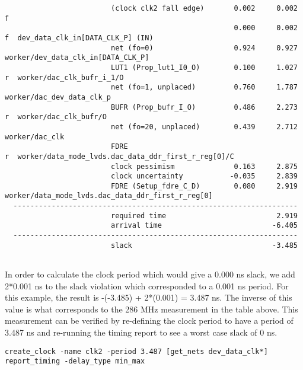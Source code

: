\documentclass{article}
\begin{document}
\begin{lstlisting}
                         (clock clk2 fall edge)       0.002     0.002 f  
                                                      0.000     0.002 f  dev_data_clk_in[DATA_CLK_P] (IN)
                         net (fo=0)                   0.924     0.927    worker/dev_data_clk_in[DATA_CLK_P]
                         LUT1 (Prop_lut1_I0_O)        0.100     1.027 r  worker/dac_clk_bufr_i_1/O
                         net (fo=1, unplaced)         0.760     1.787    worker/dac_dev_data_clk_p
                         BUFR (Prop_bufr_I_O)         0.486     2.273 r  worker/dac_clk_bufr/O
                         net (fo=20, unplaced)        0.439     2.712    worker/dac_clk
                         FDRE                                         r  worker/data_mode_lvds.dac_data_ddr_first_r_reg[0]/C
                         clock pessimism              0.163     2.875    
                         clock uncertainty           -0.035     2.839    
                         FDRE (Setup_fdre_C_D)        0.080     2.919    worker/data_mode_lvds.dac_data_ddr_first_r_reg[0]
  -------------------------------------------------------------------
                         required time                          2.919    
                         arrival time                          -6.405    
  -------------------------------------------------------------------
                         slack                                 -3.485    


\end{lstlisting}
\fontsize{10}{12}\selectfont
In order to calculate the clock period which would give a 0.000 ns slack, we add 2*0.001 ns to the slack violation which corresponded to a 0.001 ns period. For this example, the result is -(-3.485) + 2*(0.001) = 3.487 ns. The inverse of this value is what corresponds to the 286 MHz measurement in the table above. This measurement can be verified by re-defining the clock period to have a period of 3.487 ns and re-running the timing report to see a worst case slack of 0 ns.
\begin{lstlisting}
create_clock -name clk2 -period 3.487 [get_nets dev_data_clk*]
report_timing -delay_type min_max
\end{lstlisting}
\fontsize{6}{12}\selectfont
\end{document}
